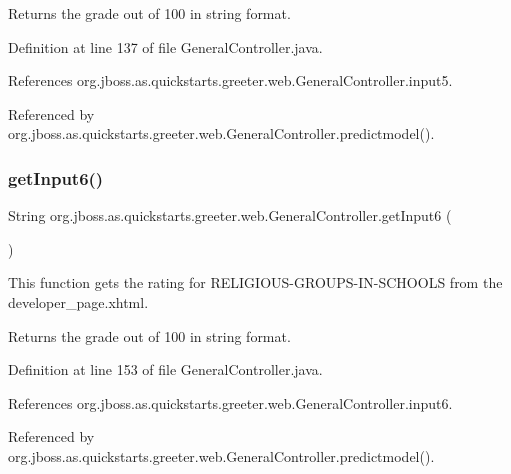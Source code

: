 \begin{DoxyReturn}{Returns}
the grade out of 100 in string format. 
\end{DoxyReturn}


Definition at line 137 of file General\+Controller.\+java.



References org.\+jboss.\+as.\+quickstarts.\+greeter.\+web.\+General\+Controller.\+input5.



Referenced by org.\+jboss.\+as.\+quickstarts.\+greeter.\+web.\+General\+Controller.\+predictmodel().

\mbox{\label{classorg_1_1jboss_1_1as_1_1quickstarts_1_1greeter_1_1web_1_1_general_controller_ae271a7e5650ec4a0ab7f5aca7bfdea36}} 
\subsubsection{\texorpdfstring{get\+Input6()}{getInput6()}}
{\footnotesize\ttfamily String org.\+jboss.\+as.\+quickstarts.\+greeter.\+web.\+General\+Controller.\+get\+Input6 (\begin{DoxyParamCaption}{ }\end{DoxyParamCaption})}



This function gets the rating for R\+E\+L\+I\+G\+I\+O\+U\+S-\/\+G\+R\+O\+U\+P\+S-\/\+I\+N-\/\+S\+C\+H\+O\+O\+LS from the developer\+\_\+page.\+xhtml. 

\begin{DoxyReturn}{Returns}
the grade out of 100 in string format. 
\end{DoxyReturn}


Definition at line 153 of file General\+Controller.\+java.



References org.\+jboss.\+as.\+quickstarts.\+greeter.\+web.\+General\+Controller.\+input6.



Referenced by org.\+jboss.\+as.\+quickstarts.\+greeter.\+web.\+General\+Controller.\+predictmodel().

